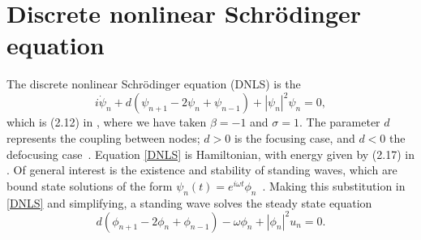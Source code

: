 \documentclass[thesis.tex]{subfiles}
\begin{document}
\section{Discrete nonlinear Schr{\"o}dinger equation}\label{sec:DNLS}

The discrete nonlinear Schr{\"o}dinger equation (DNLS) is the 
\begin{equation}\label{DNLS}
i\dot{\psi}_n + d(\psi_{n+1} - 2 \psi_n + \psi_{n-1}) + |\psi_n|^2 \psi_n = 0,
\end{equation}
which is (2.12) in \cite{Kevrekidis2009}, where we have taken $\beta = -1$ and $\sigma = 1$. The parameter $d$ represents the coupling between nodes; $d > 0$ is the focusing case, and $d < 0$ the defocusing case~\cite{Kevrekidis2009}. Equation \cref{DNLS} is Hamiltonian, with energy given by (2.17) in \cite{Kevrekidis2009,pelinovsky_2011}. Of general interest is the existence and stability of standing waves, which are bound state solutions of the form $\psi_n(t) = e^{i \omega t}\phi_n$~\cite{alfimov}. Making this substitution in \cref{DNLS} and simplifying, a standing wave solves the steady state equation
\begin{equation}\label{DNLSequilib}
d(\phi_{n+1} - 2 \phi_n + \phi_{n-1}) - \omega \phi_n + |\phi_n|^2 u_n = 0.
\end{equation}
\end{document}
